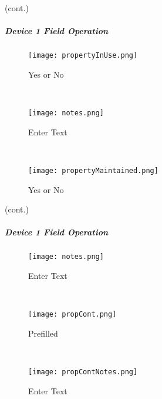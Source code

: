 {\footnotesize (cont.)}
\vspace{1in}

\vspace{2in}

\vspace{2.7in}

\clearpage


\subparagraph*{Device 1 Field Operation}
\begin{wrapfigure}{r}{0.4\textwidth}
\centering
    \texttt{[image: propertyInUse.png]}
\caption {Yes or No}
\vspace{.05in}

\HRule \\[.4cm] %
\vspace{.1in}

    \texttt{[image: notes.png]}
\caption {Enter Text}
\vspace{.05in}

\HRule \\[.4cm] %
\vspace{.1in}

    \texttt{[image: propertyMaintained.png]}
\caption{Yes or No}
\end{wrapfigure}

{\footnotesize (cont.)}
\vspace{.75in}

\vspace{2.75in}

\vspace{2.25in}


\clearpage

\subparagraph*{Device 1 Field Operation}

\begin{wrapfigure}{r}{0.4\textwidth}
\centering
    \texttt{[image: notes.png]}%
\caption {Enter Text}
\vspace{.05in}

\HRule \\[.4cm] %
\vspace{.1in}

    \texttt{[image: propCont.png]}%
\caption {Prefilled}
\vspace{.05in}

\HRule \\[.4cm] %
\vspace{.1in}

    \texttt{[image: propContNotes.png]}
\caption{Enter Text}
\end{wrapfigure}

